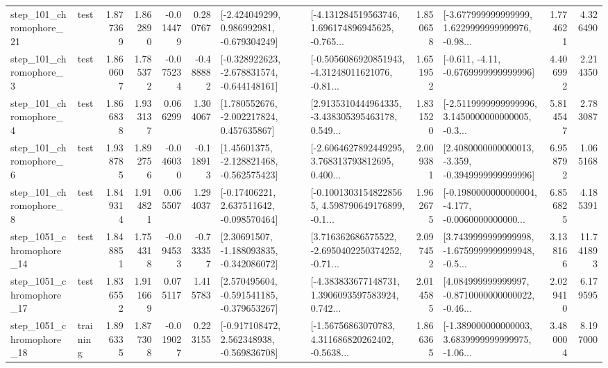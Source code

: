 \begin{tabular}{llrrrrllrlrr}
  step\_101\_chromophore\_21 &      test &      1.877369 &    1.862890 &     -0.014479 &  0.280767 &   [-2.424049299, 0.986992981, -0.679304249] &  [-4.131284519563746, 1.696174896945625, -0.765... &       1.850658 &  [-3.677999999999999, 1.6229999999999976, -0.98... &            1.774621 &          4.326490 \\
   step\_101\_chromophore\_3 &      test &      1.860607 &    1.785372 &     -0.075234 & -0.488882 &  [-0.328922623, -2.678831574, -0.644148161] &  [-0.5056086920851943, -4.31248011621076, -0.81... &       1.651952 &               [-0.611, -4.11, -0.6769999999999996] &            4.406992 &          2.214350 \\
   step\_101\_chromophore\_4 &      test &      1.866838 &    1.933137 &      0.066299 &  1.304067 &    [1.780552676, -2.002217824, 0.457635867] &  [2.9135310444964335, -3.438305395463178, 0.549... &       1.831520 &  [-2.5119999999999996, 3.1450000000000005, -0.3... &            5.814547 &          2.783087 \\
   step\_101\_chromophore\_6 &      test &      1.938785 &    1.892756 &     -0.046030 & -0.118913 &    [1.45601375, -2.128821468, -0.562575423] &  [-2.6064627892449295, 3.768313793812695, 0.400... &       2.009381 &  [2.4080000000000013, -3.359, -0.3949999999999996] &            6.958792 &          1.065168 \\
   step\_101\_chromophore\_8 &      test &      1.849314 &    1.914821 &      0.065507 &  1.294037 &    [-0.17406221, 2.637511642, -0.098570464] &  [-0.10013031548228565, 4.598790649176899, -0.1... &       1.962675 &  [-0.1980000000000004, -4.177, -0.0060000000000... &            6.856825 &          4.185391 \\
 step\_1051\_chromophore\_14 &      test &      1.848851 &    1.754318 &     -0.094533 & -0.733357 &    [2.30691507, -1.188093835, -0.342086072] &  [3.716362686575522, -2.6950402250374252, -0.71... &       2.097452 &  [3.7439999999999998, -1.6759999999999948, -0.5... &            3.138166 &         11.741893 \\
 step\_1051\_chromophore\_17 &      test &      1.836552 &    1.911669 &      0.075117 &  1.415783 &   [2.570495604, -0.591541185, -0.379653267] &  [-4.383833677148731, 1.3906093597583924, 0.742... &       2.014585 &  [4.084999999999997, -0.8710000000000022, -0.46... &            2.029410 &          6.179595 \\
 step\_1051\_chromophore\_18 &  training &      1.896335 &    1.877308 &     -0.019027 &  0.223155 &   [-0.917108472, 2.562348938, -0.569836708] &  [-1.56756863070783, 4.311686820262402, -0.5638... &       1.866365 &  [-1.389000000000003, 3.6839999999999975, -1.06... &            3.480004 &          8.197000 \\

\end{tabular}
